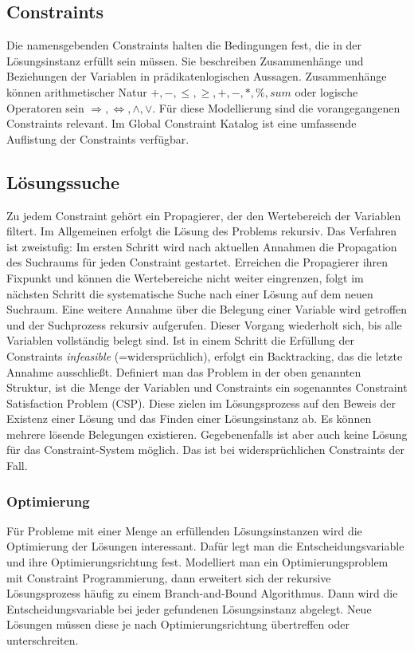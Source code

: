 \subsection{Constraints}
Die namensgebenden Constraints halten die Bedingungen fest, die in der Lösungsinstanz erfüllt sein müssen. Sie beschreiben Zusammenhänge und Beziehungen der Variablen in prädikatenlogischen Aussagen. Zusammenhänge können arithmetischer Natur $ +, -, \le, \ge, +, -, * , \%, sum$ oder logische Operatoren sein $\Rightarrow, \Leftrightarrow, \wedge, \vee $.
Für diese Modellierung sind die vorangegangenen Constraints relevant. Im Global Constraint Katalog \cite{GlobalConstraintWeb} ist eine umfassende Auflistung der Constraints verfügbar. 
\subsection{Lösungssuche}
Zu jedem Constraint gehört ein Propagierer, der den Wertebereich der Variablen filtert. Im Allgemeinen erfolgt die Lösung des Problems rekursiv. Das Verfahren ist zweistufig: Im ersten Schritt wird nach aktuellen Annahmen die Propagation des Suchraums für jeden Constraint gestartet. Erreichen die Propagierer ihren Fixpunkt und können die Wertebereiche nicht weiter eingrenzen, folgt im nächsten Schritt die systematische Suche nach einer Lösung auf dem neuen Suchraum. Eine weitere Annahme über die Belegung einer Variable wird getroffen und der Suchprozess rekursiv aufgerufen. Dieser Vorgang wiederholt sich, bis alle Variablen vollständig belegt sind. Ist in einem Schritt die Erfüllung der Constraints \textit{infeasible} (=widersprüchlich), erfolgt ein Backtracking, das die letzte Annahme ausschließt.
Definiert man das Problem in der oben genannten Struktur, ist die Menge der Variablen und Constraints ein sogenanntes Constraint Satisfaction Problem (CSP). Diese zielen im Lösungsprozess auf den Beweis der Existenz einer Lösung und das Finden einer Lösungsinstanz ab. Es können mehrere lösende Belegungen existieren. Gegebenenfalls ist aber auch keine Lösung für das Constraint-System möglich. Das ist bei widersprüchlichen Constraints der Fall. 

\subsubsection{Optimierung}
Für Probleme mit einer Menge an erfüllenden Lösungsinstanzen wird die Optimierung der Lösungen interessant. Dafür legt man die Entscheidungsvariable und ihre Optimierungsrichtung fest. 
Modelliert man ein Optimierungsproblem mit Constraint Programmierung, dann erweitert sich der rekursive Lösungsprozess häufig zu einem Branch-and-Bound Algorithmus. Dann wird die Entscheidungsvariable bei jeder gefundenen Lösungsinstanz abgelegt. Neue Lösungen müssen diese je nach Optimierungsrichtung übertreffen oder unterschreiten.

